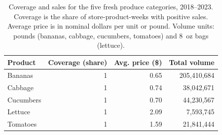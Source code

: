\begin{table}[!h]
\centering
\caption{\label{tab:product_coverage}Coverage and sales for the five fresh produce categories, 2018--2023. Coverage is the share of store-product-weeks with positive sales. Average price is in nominal dollars per unit or pound. Volume units: pounds (bananas, cabbage, cucumbers, tomatoes) and 8~oz bags (lettuce).}
\centering
\begin{tabular}[t]{lrrr}
\toprule
Product & Coverage (share) & Avg. price (\$) & Total volume\\
\midrule
Bananas & 1 & 0.65 & 205,410,684\\
Cabbage & 1 & 0.74 & 38,042,671\\
Cucumbers & 1 & 0.70 & 44,230,567\\
Lettuce & 1 & 2.09 & 7,593,745\\
Tomatoes & 1 & 1.59 & 21,841,444\\
\bottomrule
\end{tabular}
\end{table}
